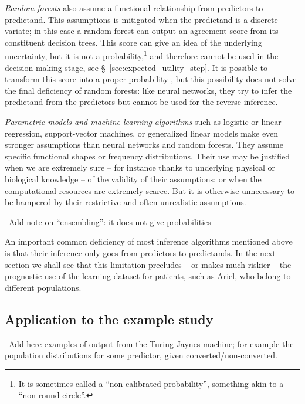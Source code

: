 \documentclass[utf8]{FrontiersinHarvard} %
\newcommand*{\wrench}{{\fontencoding{U}\fontfamily{fontawesomethree}\selectfont\symbol{114}}}
\newcommand{\mynotew}[1]{{\color{notecolour}\wrench\ #1}}
\newcommand*{\sect}{\S}%
\renewcommand*{\|}[1][]{\nonscript\:#1\vert\nonscript\:\mathopen{}}
\newcommand*{\tjm}{Turing-Jaynes machine}
\begin{document}
\emph{Random forests} also assume a functional relationship from predictors to predictand. This assumptions is mitigated when the predictand is a discrete variate; in this case a random forest can output an agreement score from its constituent decision trees. This score can give an idea of the underlying uncertainty, but it is not a probability,\footnote{It is sometimes called a \enquote{non-calibrated probability}, something akin to a \enquote{non-round circle}.} and therefore cannot be used in the decision-making stage, see \sect~\ref{sec:expected_utility_step}. It is possible to transform this score into a proper probability \citep{dyrlandetal2022b}, but this possibility does not solve the final deficiency of random forests: like neural networks, they try to infer the predictand from the predictors but cannot be used for the reverse inference.

\emph{Parametric models and machine-learning algorithms} such as logistic or linear regression, support-vector machines, or generalized linear models make even stronger assumptions than neural networks and random forests. They assume specific functional shapes or frequency distributions. Their use may be justified when we are extremely sure -- for instance thanks to underlying physical or biological knowledge -- of the validity of their assumptions; or when the computational resources are extremely scarce. But it is otherwise unnecessary to be hampered by their restrictive and often unrealistic assumptions.

\mynotew{Add note on \enquote{ensembling}: it does not give probabilities \citep[\sect~18.2]{murphy2022}}

\medskip

An important common deficiency of most inference algorithms mentioned above is that their inference only goes from predictors to predictands. In the next section we shall see that this limitation precludes -- or makes much riskier -- the prognostic use of the learning dataset for patients, such as Ariel, who belong to different populations.

\subsection{Application to the example study}
\label{sec:learn_application}

\mynotew{Add here examples of output from the \tjm; for example the population distributions for some predictor, given converted/non-converted.}
\end{document}
